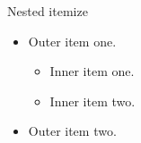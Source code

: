 \documentclass[14pt,t]{beamer}
\begin{document}
\begin{frame}{Nested itemize}
\begin{itemize}
\item Outer item one.
  \begin{itemize}
  \item Inner item one.
  \item Inner item two.
  \end{itemize}
\item Outer item two.
\end{itemize}
\end{frame}
\end{document}
